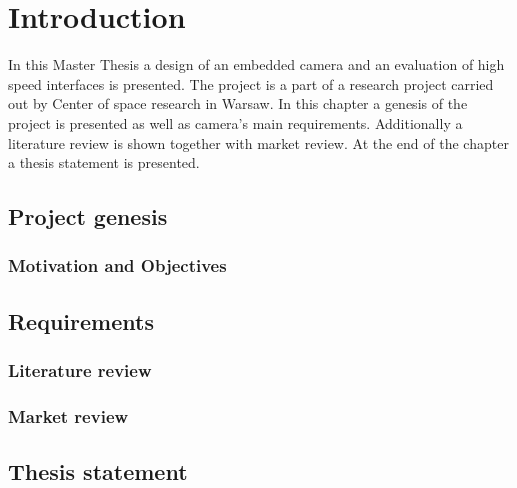 \pagestyle{plain}
\chapter{Introduction}
In this Master Thesis a design of an embedded camera and an evaluation of high speed interfaces is presented. The project is a part of a research project carried out by Center of space research in Warsaw. In this chapter a genesis of the project is presented as well as camera's main requirements. Additionally a literature review is shown together with market review. At the end of the chapter a thesis statement is presented.


\lipsum[3-56]
\section{Project genesis}
\subsection{Motivation and Objectives}
\section{Requirements}
\subsection{Literature review}
\subsection{Market review} 

\section{Thesis statement} 
